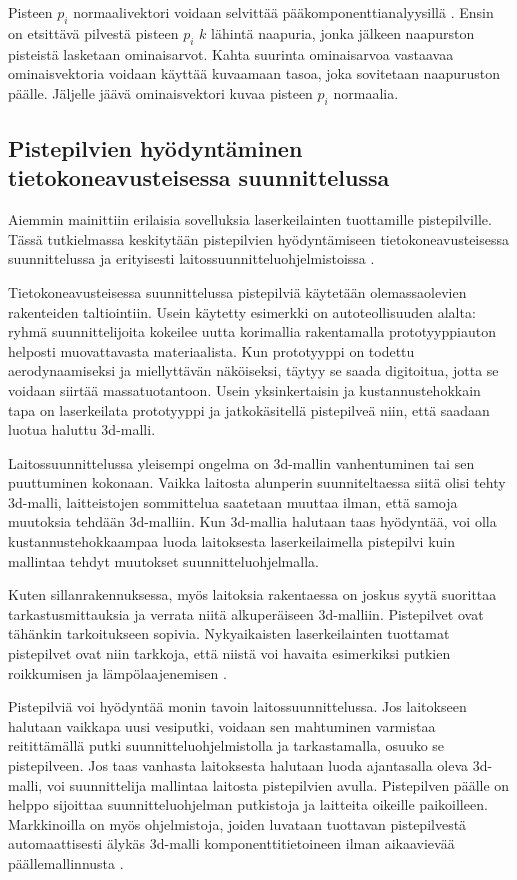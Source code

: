 Pisteen $p_i$ normaalivektori voidaan selvittää pääkomponenttianalyysillä . Ensin on etsittävä pilvestä pisteen $p_i$ $k$ lähintä naapuria, jonka jälkeen naapurston pisteistä lasketaan ominaisarvot. Kahta suurinta ominaisarvoa vastaavaa ominaisvektoria voidaan käyttää kuvaamaan tasoa, joka sovitetaan naapuruston päälle. Jäljelle jäävä ominaisvektori kuvaa pisteen $p_i$ normaalia. \cite{huang}

\subsection{Pistepilvien hyödyntäminen tietokoneavusteisessa suunnittelussa}

Aiemmin mainittiin erilaisia sovelluksia laserkeilainten tuottamille pistepilville. Tässä tutkielmassa keskitytään pistepilvien hyödyntämiseen tietokoneavusteisessa suunnittelussa  ja erityisesti laitossuunnitteluohjelmistoissa .

Tietokoneavusteisessa suunnittelussa pistepilviä käytetään olemassaolevien rakenteiden taltiointiin. Usein käytetty esimerkki on autoteollisuuden alalta: ryhmä suunnittelijoita kokeilee uutta korimallia rakentamalla prototyyppiauton helposti muovattavasta materiaalista. Kun prototyyppi on todettu aerodynaamiseksi ja miellyttävän näköiseksi, täytyy se saada digitoitua, jotta se voidaan siirtää massatuotantoon. Usein yksinkertaisin ja kustannustehokkain tapa on laserkeilata prototyyppi ja jatkokäsitellä pistepilveä niin, että saadaan luotua haluttu 3d-malli.

Laitossuunnittelussa yleisempi ongelma on 3d-mallin vanhentuminen tai sen puuttuminen kokonaan. Vaikka laitosta alunperin suunniteltaessa siitä olisi tehty 3d-malli, laitteistojen sommittelua saatetaan muuttaa ilman, että samoja muutoksia tehdään 3d-malliin. Kun 3d-mallia halutaan taas hyödyntää, voi olla kustannustehokkaampaa luoda laitoksesta laserkeilaimella pistepilvi kuin mallintaa tehdyt muutokset suunnitteluohjelmalla. \cite{Piipponen}

Kuten sillanrakennuksessa, myös laitoksia rakentaessa on joskus syytä suorittaa tarkastusmittauksia ja verrata niitä alkuperäiseen 3d-malliin. Pistepilvet ovat tähänkin tarkoitukseen sopivia. Nykyaikaisten laserkeilainten tuottamat pistepilvet ovat niin tarkkoja, että niistä voi havaita esimerkiksi putkien roikkumisen ja lämpölaajenemisen \cite{Piipponen}. 

Pistepilviä voi hyödyntää monin tavoin laitossuunnittelussa. Jos laitokseen halutaan vaikkapa uusi vesiputki, voidaan sen mahtuminen varmistaa reitittämällä putki suunnitteluohjelmistolla ja tarkastamalla, osuuko se pistepilveen. Jos taas vanhasta laitoksesta halutaan luoda ajantasalla oleva 3d-malli, voi suunnittelija mallintaa laitosta pistepilvien avulla. Pistepilven päälle on helppo sijoittaa suunnitteluohjelman putkistoja ja laitteita oikeille paikoilleen. Markkinoilla on myös ohjelmistoja, joiden luvataan tuottavan pistepilvestä automaattisesti älykäs 3d-malli komponenttitietoineen ilman aikaavievää päällemallinnusta \cite{aveva}. 


